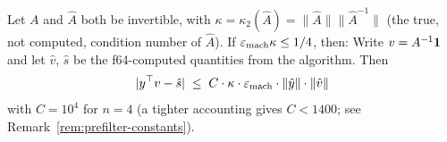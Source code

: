 %
%
%
%
%

\begin{proposition}\label{prop:prefilter-bound}
Let $A$ and $\hat{A}$ both be invertible, with
$\kappa = \kappa_2(\hat{A}) = \|\hat{A}\|\|\hat{A}^{-1}\|$
(the true, not computed, condition number of $\hat{A}$).
If $\varepsilon_{\mathrm{mach}}\kappa \le 1/4$, then:
Write $v = A^{-1}\mathbf{1}$ and let $\hat{v}$, $\hat{s}$
be the f64-computed quantities from the algorithm.
Then
\[
  |y^\top v - \hat{s}|
  \;\le\;
  C \cdot \kappa \cdot \varepsilon_{\mathrm{mach}}
  \cdot \|\hat{y}\| \cdot \|\hat{v}\|
\]
with $C = 10^4$ for $n = 4$
(a tighter accounting gives $C < 1400$; see Remark~\ref{rem:prefilter-constants}).
\end{proposition}


